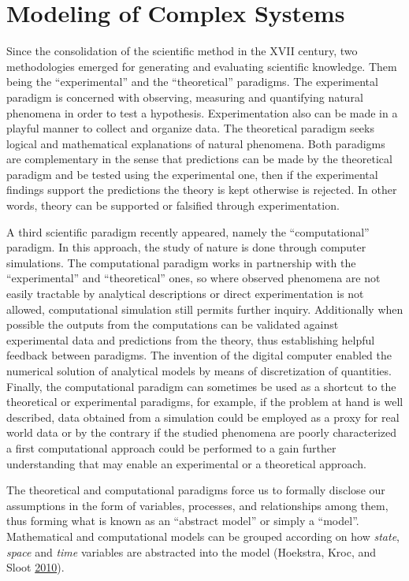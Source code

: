 \documentclass[
  12pt,
  openany]{book}
\begin{document}
\hypertarget{modeling-of-complex-systems}{%
\section{Modeling of Complex Systems}\label{modeling-of-complex-systems}}

Since the consolidation of the scientific method in the XVII century, two methodologies emerged for generating and evaluating scientific knowledge. Them being the ``experimental'' and the ``theoretical'' paradigms. The experimental paradigm is concerned with observing, measuring and quantifying natural phenomena in order to test a hypothesis. Experimentation also can be made in a playful manner to collect and organize data. The theoretical paradigm seeks logical and mathematical explanations of natural phenomena. Both paradigms are complementary in the sense that predictions can be made by the theoretical paradigm and be tested using the experimental one, then if the experimental findings support the predictions the theory is kept otherwise is rejected. In other words, theory can be supported or falsified through experimentation.

A third scientific paradigm recently appeared, namely the ``computational'' paradigm. In this approach, the study of nature is done through computer simulations. The computational paradigm works in partnership with the ``experimental'' and ``theoretical'' ones, so where observed phenomena are not easily tractable by analytical descriptions or direct experimentation is not allowed, computational simulation still permits further inquiry. Additionally when possible the outputs from the computations can be validated against experimental data and predictions from the theory, thus establishing helpful feedback between paradigms. The invention of the digital computer enabled the numerical solution of analytical models by means of discretization of quantities. Finally, the computational paradigm can sometimes be used as a shortcut to the theoretical or experimental paradigms, for example, if the problem at hand is well described, data obtained from a simulation could be employed as a proxy for real world data or by the contrary if the studied phenomena are poorly characterized a first computational approach could be performed to a gain further understanding that may enable an experimental or a theoretical approach.

The theoretical and computational paradigms force us to formally disclose our assumptions in the form of variables, processes, and relationships among them, thus forming what is known as an ``abstract model'' or simply a ``model''. Mathematical and computational models can be grouped according on how \emph{state}, \emph{space} and \emph{time} variables are abstracted into the model (Hoekstra, Kroc, and Sloot \protect\hyperlink{ref-hoekstra2010simulating}{2010}).
\end{document}

